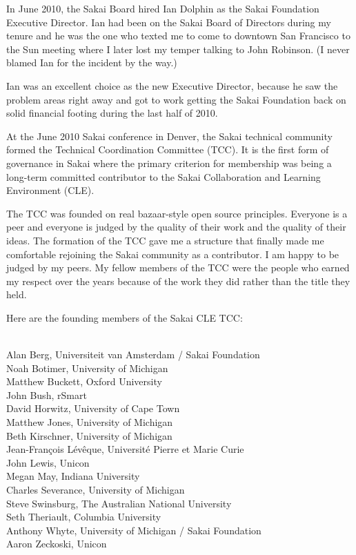 \documentclass[12pt]{book}
\begin{document}
In June 2010, the Sakai Board hired Ian Dolphin as the Sakai Foundation
Executive Director.  Ian had been on the Sakai Board of Directors
during my tenure and
he was the one who texted me to come to downtown San Francisco to the
Sun meeting where I later lost my temper talking to John Robinson.  (I never
blamed Ian for the incident by the way.)

Ian was an excellent choice as the new Executive Director, because he saw the
problem areas right away and got to work getting the Sakai Foundation
back on solid financial footing during the last half of 2010.

At the June 2010 Sakai conference in Denver, the Sakai technical
community formed the Technical Coordination Committee (TCC).
It is the first form of governance in Sakai where the primary
criterion for membership was being a long-term committed
contributor to the Sakai Collaboration and Learning Environment
(CLE).

The TCC was founded on real bazaar-style open source principles.
Everyone is a peer and everyone is judged by the quality of their work
and the quality of their ideas.  The formation of the TCC gave me
a structure that finally made me comfortable rejoining the Sakai
community as a contributor.  I am happy to be judged by my peers.
My fellow members of the TCC were the people who earned my respect
over the years because of the work they did rather than the
title they held.

Here are the founding members of the Sakai CLE TCC:\\
\\
\begin{sf}
Alan Berg, Universiteit van Amsterdam / Sakai Foundation\\
Noah Botimer, University of Michigan\\
Matthew Buckett, Oxford University\\
John Bush, rSmart \\
David Horwitz, University of Cape Town\\
Matthew Jones, University of Michigan \\
Beth Kirschner, University of Michigan\\
Jean-Fran\c{c}ois L\'{e}v\^{e}que, Universit\'{e} Pierre et Marie Curie\\
John Lewis, Unicon\\
Megan May, Indiana University\\
Charles Severance, University of Michigan\\
Steve Swinsburg, The Australian National University\\
Seth Theriault, Columbia University\\
Anthony Whyte, University of Michigan / Sakai Foundation\\
Aaron Zeckoski, Unicon\\
\end{sf}
\end{document}
